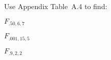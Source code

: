 \begin{problem}
  Use Appendix Table~A.4 to find:
\end{problem}

\begin{subproblem}
  $F_{.50,6,7}$
\end{subproblem}

\begin{subproblem}
  $F_{.001,15,5}$
\end{subproblem}

\begin{subproblem}
  $F_{.9,2,2}$
\end{subproblem}
